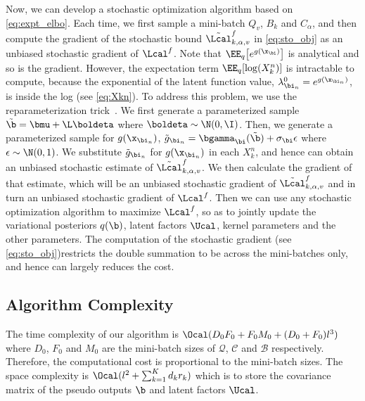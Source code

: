 Now, we can develop a stochastic optimization algorithm based on \eqref{eq:expt_elbo}. Each time, we first sample a mini-batch $Q_v$,   $B_k$ and $C_\alpha$, and then compute the gradient of the stochastic bound $\tilde{\Lcal}_{k,\alpha,v}^f$ in \eqref{eq:sto_obj} as an unbiased stochastic gradient of $\Lcal^f$. Note that $\EE_{q}\big[e^{g(\x_\bi)}\big]$ is analytical and so is the gradient. However, the expectation term $\EE_q[\log(X_k^n)]$ is intractable to compute, because the exponential of the latent function value,  $\lambda_{\bi_n}^0 = e^{g(\x_{\bi_n})}$, is inside the log (see \eqref{eq:Xkn}). To address this problem, we  use the reparameterization trick~\citep{kingma2013auto}. We first generate a parameterized sample $\tilde{\b} = \bmu + \L  \boldeta$ where $\boldeta \sim \N(0, \I)$. Then, we generate a parameterized sample for $g(\x_{\bi_n})$, $\tilde{g}_{\bi_n} =\bgamma_{\bi}(\tilde{\b}) + \sigma_\bi \epsilon $ where $\epsilon \sim \N(0, 1)$. We substitute $\tilde{g}_{\bi_n} $ for $g(\x_{\bi_n})$ in each $X_k^n$, and hence can obtain an unbiased stochastic estimate of $\tilde{\Lcal}^f_{k,\alpha,v}$. We then calculate the gradient of that estimate, which will be an unbiased stochastic gradient of $\tilde{\Lcal}_{k,\alpha,v}^f$ and in turn an unbiased stochastic gradient of $\Lcal^f$. Then we can use any stochastic optimization algorithm to maximize $\Lcal^f$, so as to jointly update the variational posteriors $q(\b)$, latent factors $\Ucal$, kernel parameters and the other parameters. The computation of the stochastic gradient (see \eqref{eq:sto_obj})restricts the double summation to be across the mini-batches only, and hence can largely reduces the cost. 
\subsection{Algorithm Complexity}
The time complexity of our algorithm is $\Ocal(D_0F_0 + F_0M_0 + (D_0+F_0)l^3)$ where $D_0$, $F_0$ and $M_0$ are the mini-batch sizes of $\mathcal{Q}$, $\mathcal{C}$ and $\mathcal{B}$ respectively. Therefore, the computational cost is proportional to the mini-batch sizes.  The space complexity is $\Ocal(l^2 + \sum_{k=1}^K d_k r_k)$ which is to store the covariance matrix of the pseudo outputs $\b$ and latent factors $\Ucal$. 

